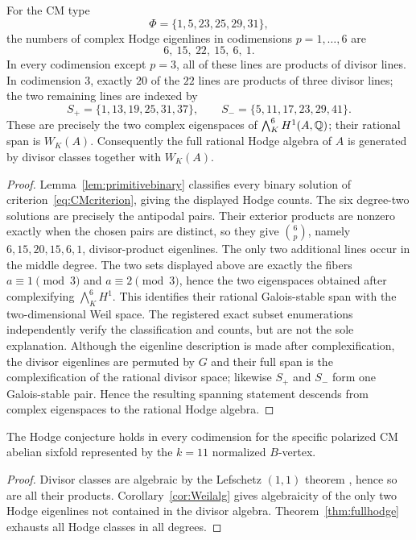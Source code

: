 \begin{theorem}\label{thm:fullhodge}
For the CM type
\[
 \Phi=\{1,5,23,25,29,31\},
\]
the numbers of complex Hodge eigenlines in codimensions $p=1,\ldots,6$ are
\[
 6,\ 15,\ 22,\ 15,\ 6,\ 1.
\]
In every codimension except $p=3$, all of these lines are products of divisor lines.  In codimension $3$, exactly $20$ of the $22$ lines are products of three divisor lines; the two remaining lines are indexed by
\[
 S_+=\{1,13,19,25,31,37\},\qquad
 S_-=\{5,11,17,23,29,41\}.
\]
These are precisely the two complex eigenspaces of $\bigwedge_K^6 H^1(A,\mathbb Q)$; their rational span is $W_K(A)$.  Consequently the full rational Hodge algebra of $A$ is generated by divisor classes together with $W_K(A)$.
\end{theorem}
\begin{proof}
Lemma~\ref{lem:primitivebinary} classifies every binary solution of
criterion~\eqref{eq:CMcriterion}, giving the displayed Hodge counts.  The six
degree-two solutions are precisely the antipodal pairs.  Their exterior
products are nonzero exactly when the chosen pairs are distinct, so they give
$\binom6p$, namely $6,15,20,15,6,1$, divisor-product eigenlines.  The only two
additional lines occur in the middle degree.  The two sets displayed above
are exactly the fibers $a\equiv1\pmod3$ and $a\equiv2\pmod3$, hence the two
eigenspaces obtained after complexifying $\bigwedge_K^6H^1$.  This identifies
their rational Galois-stable span with the two-dimensional Weil space.  The
registered exact subset enumerations independently verify the classification
and counts, but are not the sole explanation.
Although the eigenline description is made after complexification, the divisor eigenlines are
permuted by $G$ and their full span is the complexification of the rational divisor space;
likewise $S_+$ and $S_-$ form one Galois-stable pair.  Hence the resulting spanning
statement descends from complex eigenspaces to the rational Hodge algebra.
\end{proof}

\begin{corollary}\label{cor:HCspecific}
The Hodge conjecture holds in every codimension for the specific polarized CM abelian sixfold represented by the $k=11$ normalized $B$-vertex.
\end{corollary}
\begin{proof}
Divisor classes are algebraic by the Lefschetz $(1,1)$ theorem \cite[\S2, Remarks~(iii), p.~49]{DeligneHodge2006}, hence so are all their products.  Corollary~\ref{cor:Weilalg} gives algebraicity of the only two Hodge eigenlines not contained in the divisor algebra.  Theorem~\ref{thm:fullhodge} exhausts all Hodge classes in all degrees.
\end{proof}



